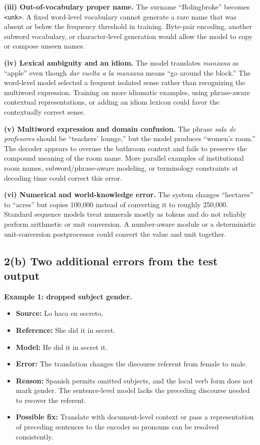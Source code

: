 \documentclass[10pt]{article}
\newcommand{\code}[1]{\texttt{#1}}
\begin{document}
\textbf{(iii) Out-of-vocabulary proper name.}
The surname ``Bolingbroke'' becomes \code{<unk>}. A fixed word-level vocabulary cannot generate a rare name that was absent or below the frequency threshold in training. Byte-pair encoding, another subword vocabulary, or character-level generation would allow the model to copy or compose unseen names.

\textbf{(iv) Lexical ambiguity and an idiom.}
The model translates \emph{manzana} as ``apple'' even though \emph{dar vuelta a la manzana} means ``go around the block.'' The word-level model selected a frequent isolated sense rather than recognizing the multiword expression. Training on more idiomatic examples, using phrase-aware contextual representations, or adding an idiom lexicon could favor the contextually correct sense.

\textbf{(v) Multiword expression and domain confusion.}
The phrase \emph{sala de profesores} should be ``teachers' lounge,'' but the model produces ``women's room.'' The decoder appears to overuse the bathroom context and fails to preserve the compound meaning of the room name. More parallel examples of institutional room names, subword/phrase-aware modeling, or terminology constraints at decoding time could correct this error.

\textbf{(vi) Numerical and world-knowledge error.}
The system changes ``hectares'' to ``acres'' but copies 100,000 instead of converting it to roughly 250,000. Standard sequence models treat numerals mostly as tokens and do not reliably perform arithmetic or unit conversion. A number-aware module or a deterministic unit-conversion postprocessor could convert the value and unit together.

\subsection*{2(b) Two additional errors from the test output}

\textbf{Example 1: dropped subject gender.}

\begin{itemize}
  \item \textbf{Source:} Lo haca en secreto,
  \item \textbf{Reference:} She did it in secret.
  \item \textbf{Model:} He did it in secret it.
  \item \textbf{Error:} The translation changes the discourse referent from female to male.
  \item \textbf{Reason:} Spanish permits omitted subjects, and the local verb form does not mark gender. The sentence-level model lacks the preceding discourse needed to recover the referent.
  \item \textbf{Possible fix:} Translate with document-level context or pass a representation of preceding sentences to the encoder so pronouns can be resolved consistently.
\end{itemize}
\end{document}
